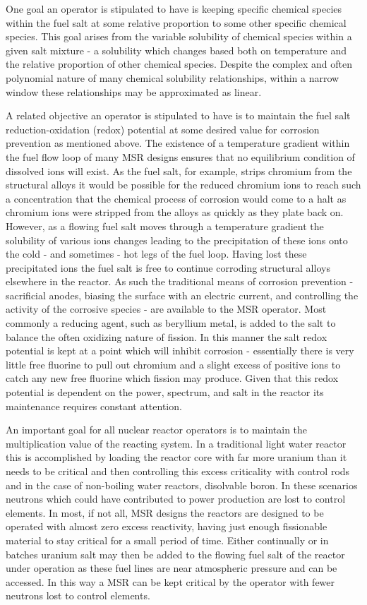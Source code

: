 One goal an operator is stipulated to have is keeping specific chemical
species within the fuel salt at some relative proportion to some other
specific chemical species. This goal arises from the variable solubility of
chemical species within a given salt mixture - a solubility which changes
based both on temperature and the relative proportion of other chemical species.
Despite the complex and often polynomial nature of many chemical solubility
relationships, within a narrow window these relationships may be approximated
as linear.

A related objective an operator is stipulated to have is to maintain the fuel
salt reduction-oxidation (redox) potential at some desired value for corrosion
prevention as mentioned above. The existence of a temperature gradient within
the fuel flow loop of many MSR designs ensures that no equilibrium condition of
dissolved ions will exist. As the fuel salt, for example, strips chromium from
the structural alloys it would be possible for the reduced chromium ions to
reach such a concentration that the chemical process of corrosion would come to
a halt as chromium ions were stripped from the alloys as quickly as they
plate back on. However, as a flowing fuel salt moves through a temperature
gradient the solubility of various ions changes leading to the precipitation of
these ions onto the cold - and sometimes - hot legs of the fuel loop. Having
lost these precipitated ions the fuel salt is free to continue corroding
structural alloys elsewhere in the reactor. As such the traditional means of 
corrosion prevention - sacrificial anodes, biasing the surface with an electric
current, and controlling the activity of the corrosive species - are available
to the MSR operator. Most commonly a reducing agent, such as beryllium metal,
is added to the salt to balance the often oxidizing nature of fission. In
this manner the salt redox potential is kept at a point which will inhibit
corrosion - essentially there is very little free fluorine to pull out chromium
and a slight excess of positive ions to catch any new free fluorine which
fission may produce. Given that this redox potential is dependent on the power,
spectrum, and salt in the reactor its maintenance requires constant attention.

An important goal for all nuclear reactor
operators is to maintain the multiplication value of the reacting system. In a
traditional light water reactor this is accomplished by loading the reactor
core with far more uranium than it needs to be critical and then controlling
this excess criticality with control rods and in the case of non-boiling water
reactors, disolvable boron. In these scenarios neutrons which could have
contributed to power production are lost to control elements. In most, if not
all, MSR designs the reactors are designed to be operated with almost zero
excess reactivity, having just enough fissionable material to stay critical for
a small period of time. Either continually or in batches uranium salt may then
be added to the flowing fuel salt of the reactor under operation as these fuel
lines are near atmospheric pressure and can be accessed. In this way a MSR can
be kept critical by the operator with fewer neutrons lost to control elements.

